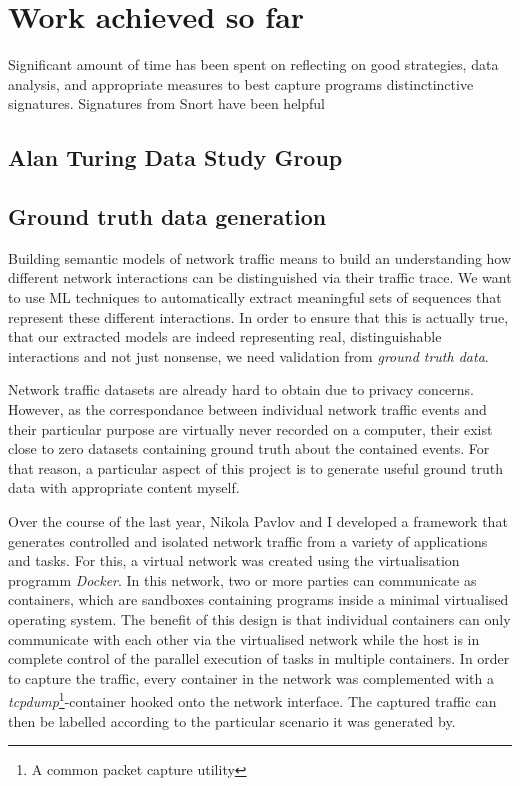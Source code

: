 \documentclass[a4paper,12pt,twoside]{report}
\begin{document}
\section{Work achieved so far}



Significant amount of time has been spent on reflecting on good strategies, data analysis, and appropriate measures to best capture programs distinctinctive signatures. Signatures from Snort have been helpful


\subsection{Alan Turing Data Study Group}


\subsection{Ground truth data generation}

Building semantic models of network traffic means to build an understanding how different network interactions can be distinguished via their traffic trace. We want to use ML techniques to automatically extract meaningful sets of sequences that represent these different interactions. In order to ensure that this is actually true, that our extracted models are indeed representing real, distinguishable interactions and not just nonsense, we need validation from \textit{ground truth data}. 

Network traffic datasets are already hard to obtain due to privacy concerns. However, as  the correspondance between individual network traffic events and their particular purpose are virtually never recorded on a computer, their exist close to zero datasets containing ground truth about the contained events. For that reason, a particular aspect of this project is to generate useful ground truth data with appropriate content myself.

Over the course of the last year, Nikola Pavlov and I developed a framework that generates controlled and isolated network traffic from a variety of applications and tasks. For this, a virtual network was created using the virtualisation programm \textit{Docker}. In this network, two or more parties can communicate as containers,  which are sandboxes containing programs inside a minimal virtualised operating system. The benefit of this design is that individual containers can only communicate with each other via the virtualised network while the host is in complete control of the parallel execution of tasks in multiple containers. In order to capture the traffic, every container in the network was complemented with a \textit{tcpdump}\footnote{A common packet capture utility}-container hooked onto the network interface. The captured traffic can then be labelled according to the particular scenario it was generated by.
\end{document}
